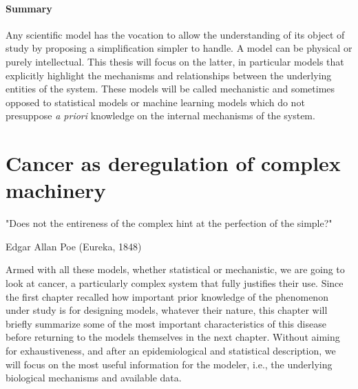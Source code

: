\documentclass[a4paper,12pt,twoside,onecolumn,openright,final,oldfontcommands]{memoir}
\newcommand{\initial}[1]{
	\lettrine[lines=3,lhang=0.33,nindent=0em]{
		\color{gray}
     		{\textsc{#1}}}{}}
\let\BeginKnitrBlock\begin \let\EndKnitrBlock\end
\begin{document}
\BeginKnitrBlock{conclubox}
\subsubsection*{Summary}\label{summary}

Any scientific model has the vocation to allow the understanding of its
object of study by proposing a simplification simpler to handle. A model
can be physical or purely intellectual. This thesis will focus on the
latter, in particular models that explicitly highlight the mechanisms
and relationships between the underlying entities of the system. These
models will be called mechanistic and sometimes opposed to statistical
models or machine learning models which do not presuppose \emph{a
priori} knowledge on the internal mechanisms of the system.
\EndKnitrBlock{conclubox}

\chapter{Cancer as deregulation of complex
machinery}\label{cancer-as-deregulation-of-complex-machinery}

\epigraph{"Does not the entireness of the complex hint at the perfection of the simple?"}{Edgar Allan Poe (Eureka, 1848)}

\initial{A}rmed with all these models, whether statistical or
mechanistic, we are going to look at cancer, a particularly complex
system that fully justifies their use. Since the first chapter recalled
how important prior knowledge of the phenomenon under study is for
designing models, whatever their nature, this chapter will briefly
summarize some of the most important characteristics of this disease
before returning to the models themselves in the next chapter. Without
aiming for exhaustiveness, and after an epidemiological and statistical
description, we will focus on the most useful information for the
modeler, i.e., the underlying biological mechanisms and available data.
\end{document}

